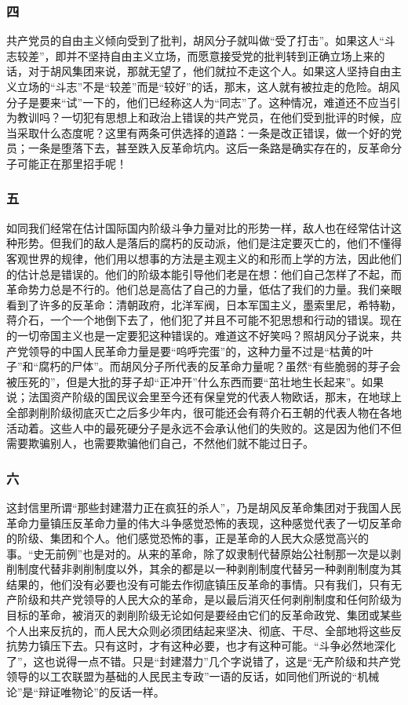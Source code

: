 \documentclass[cn,11pt,chinese]{elegantbook}
\def\myformat#1{\hfil\hfil #1}
\begin{document}
\subsubsection*{\myformat{四}}
共产党员的自由主义倾向受到了批判，胡风分子就叫做“受了打击”。如果这人“斗志较差”，即并不坚持自由主义立场，而愿意接受党的批判转到正确立场上来的话，对于胡风集团来说，那就无望了，他们就拉不走这个人。如果这人坚持自由主义立场的“斗志”不是“较差”而是“较好”的话，那末，这人就有被拉走的危险。胡风分子是要来“试”一下的，他们已经称这人为“同志”了。这种情况，难道还不应当引为教训吗？一切犯有思想上和政治上错误的共产党员，在他们受到批评的时候，应当采取什么态度呢？这里有两条可供选择的道路：一条是改正错误，做一个好的党员；一条是堕落下去，甚至跌入反革命坑内。这后一条路是确实存在的，反革命分子可能正在那里招手呢！\\
\subsubsection*{\myformat{五}}
如同我们经常在估计国际国内阶级斗争力量对比的形势一样，敌人也在经常估计这种形势。但我们的敌人是落后的腐朽的反动派，他们是注定要灭亡的，他们不懂得客观世界的规律，他们用以想事的方法是主观主义的和形而上学的方法，因此他们的估计总是错误的。他们的阶级本能引导他们老是在想：他们自己怎样了不起，而革命势力总是不行的。他们总是高估了自己的力量，低估了我们的力量。我们亲眼看到了许多的反革命：清朝政府，北洋军阀，日本军国主义，墨索里尼，希特勒，蒋介石，一个一个地倒下去了，他们犯了并且不可能不犯思想和行动的错误。现在的一切帝国主义也是一定要犯这种错误的。难道这不好笑吗？照胡风分子说来，共产党领导的中国人民革命力量是要“呜呼完蛋”的，这种力量不过是“枯黄的叶子”和“腐朽的尸体”。而胡风分子所代表的反革命力量呢？虽然“有些脆弱的芽子会被压死的”，但是大批的芽子却“正冲开”什么东西而要“茁壮地生长起来”。如果说；法国资产阶级的国民议会里至今还有保皇党的代表人物欧话，那末，在地球上全部剥削阶级彻底灭亡之后多少年内，很可能还会有蒋介石王朝的代表人物在各地活动着。这些人中的最死硬分子是永远不会承认他们的失败的。这是因为他们不但需要欺骗别人，也需要欺骗他们自己，不然他们就不能过日子。\\
\subsubsection*{\myformat{六}}
这封信里所谓“那些封建潜力正在疯狂的杀人”，乃是胡风反革命集团对于我国人民革命力量镇压反革命力量的伟大斗争感觉恐怖的表现，这种感觉代表了一切反革命的阶级、集团和个人。他们感觉恐怖的事，正是革命的人民大众感觉高兴的事。“史无前例”也是对的。从来的革命，除了奴隶制代替原始公社制那一次是以剥削制度代替非剥削制度以外，其余的都是以一种剥削制度代替另一种剥削制度为其结果的，他们没有必要也没有可能去作彻底镇压反革命的事情。只有我们，只有无产阶级和共产党领导的人民大众的革命，是以最后消灭任何剥削制度和任何阶级为目标的革命，被消灭的剥削阶级无论如何是要经由它们的反革命政党、集团或某些个人出来反抗的，而人民大众则必须团结起来坚决、彻底、干尽、全部地将这些反抗势力镇压下去。只有这时，才有这种必要，也才有这种可能。“斗争必然地深化了”，这也说得一点不错。只是“封建潜力”几个字说错了，这是“无产阶级和共产党领导的以工农联盟为基础的人民民主专政”一语的反话，如同他们所说的“机械论”是“辩证唯物论”的反话一样。\\
\end{document}
